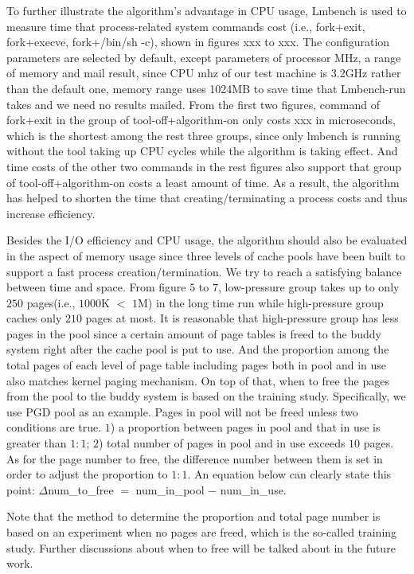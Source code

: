 \documentclass[letterpaper,twocolumn,10pt]{article}
\begin{document}
To further illustrate the algorithm’s advantage in CPU usage, Lmbench is used to measure time that process-related system commands cost (i.e., fork+exit, fork+execve, fork+/bin/sh -c), shown in figures xxx to xxx. The configuration parameters are selected by default, except parameters of processor MHz, a range of memory and mail result, since CPU mhz of our test machine is 3.2GHz rather than the default one, memory range uses 1024MB to save time that Lmbench-run takes and we need no results mailed.
From the first two figures, command of fork+exit in the group of tool-off+algorithm-on only costs xxx in microseconds, which is the shortest among the rest three groups, since only lmbench is running without the tool taking up CPU cycles while the algorithm is taking effect. And time costs of the other two commands in the rest figures also support that group of tool-off+algorithm-on costs a least amount of time. As a result, the algorithm has helped to shorten the time that creating/terminating a process costs and thus increase efficiency.

Besides the I/O efficiency and CPU usage, the algorithm should also be evaluated in the aspect of memory usage since three levels of cache pools have been built to support a fast process creation/termination. We try to reach a satisfying balance between time and space. From figure $5$ to $7$, low-pressure group takes up to only $250$ pages(i.e., $1000$K $<$ $1$M) in the long time run while high-pressure group caches only $210$ pages at most. It is reasonable that high-pressure group has less pages in the pool since a certain amount of page tables is freed to the buddy system right after the cache pool is put to use. And the proportion among the total pages of each level of page table including pages both in pool and in use also matches kernel paging mechanism. On top of that, when to free the pages from the pool to the buddy system is based on the training study. Specifically, we use PGD pool as an example. Pages in pool will not be freed unless two conditions are true. $1$) a proportion between pages in pool and that in use is greater than $1:1$; $2$) total number of pages in pool and in use exceeds $10$ pages. As for the page number to free, the difference number between them is set in order to adjust the proportion to $1:1$. An equation below can clearly state this point: $\Delta$num\_to\_free $=$ num\_in\_pool $-$ num\_in\_use.

Note that the method to determine the proportion and total page number is based on an experiment when no pages are freed, which is the so-called training study. Further discussions about when to free will be talked about in the future work.
\end{document}
